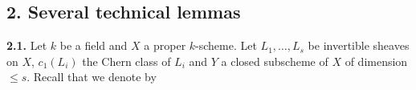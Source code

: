 \subsection*{2. Several technical lemmas}
\textbf{2.1.} Let \(k\) be a field and \(X\) a proper \(k\)-scheme. Let \(L_1,\ldots,L_s\) be invertible sheaves on \(X\), \(c_1(L_i)\) the Chern class of \(L_i\) and \(Y\) a closed subscheme of \(X\) of dimension \(\le s\). Recall that we denote by
